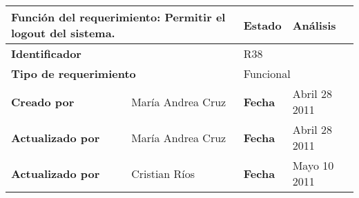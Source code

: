 \begin{center}
\begin{longtable}{|p{}|p{}|p{}|p{}|}
\hline
\multicolumn{2}{|p{0.45\textwidth}|}{{\bf {Función del requerimiento:}}
Permitir el logout del sistema. } & {\bf{ Estado}} & Análisis \\
\hline
\multicolumn{2}{|p{0.45\textwidth}}{\bf Identificador} &
\multicolumn{2}{|p{0.45\textwidth}|}{R38} \\
\hline
\multicolumn{2}{|p{0.45\textwidth}}{\bf {Tipo de requerimiento}} &
\multicolumn{2}{|p{0.45\textwidth}|}{Funcional}\\
\hline
\bf {Creado por} & María Andrea  Cruz& \bf {Fecha  } & Abril  28 2011\\
\hline
\bf {Actualizado por} & María Andrea Cruz & \bf {Fecha }& Abril 28 2011\\
\hline
\bf {Actualizado por} & Cristian Ríos & \bf {Fecha }& Mayo 10 2011\\



\end{longtable}
\end{center}
